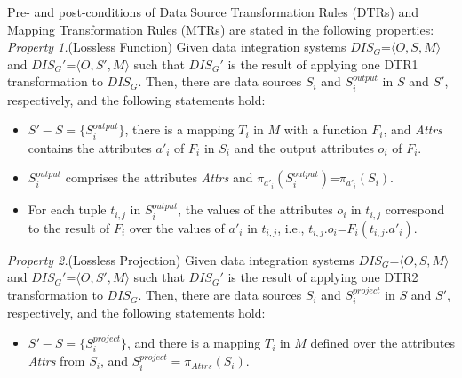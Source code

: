 Pre- and post-conditions of Data Source Transformation Rules (DTRs) and Mapping Transformation Rules (MTRs) are stated in the following properties:
\noindent\textit{Property 1.}(Lossless Function)
\label{property:p1}
Given data integration systems $DIS_G$=$\langle O,S,M \rangle$ and  $DIS_G'$=$\langle O,S',M \rangle$ such that $DIS_G'$ is the result of applying one DTR1 transformation to $DIS_G$. Then, there are data sources $S_i$ and 
$S_i^{output}$ in $S$ and $S'$, respectively, and the following statements hold:
\begin{itemize}
    \item $S'- S=\{S_i^{output}\}$, there is a mapping $T_i$ in $M$ with a function $F_i$, and \textit{Attrs} contains the attributes $a'_i$ of $F_i$ in $S_i$ and the output attributes $o_i$ of $F_i$. 
    \item  $S_i^{output}$ comprises the attributes \textit{Attrs} and $\pi_{a'_i}(S_i^{output})$=$\pi_{a'_i}(S_i)$.  
    \item For each tuple $t_{i,j}$ in $S_i^{output}$, the values of the attributes $o_i$ in $t_{i,j}$ correspond to the result of $F_i$ over the values of $a'_i$ in $t_{i,j}$, i.e., $t_{i,j}.o_i$=$F_i(t_{i,j}.a'_i)$. 
    
\end{itemize}


\noindent\textit{Property 2.}(Lossless Projection)
\label{property:p2}
Given data integration systems $DIS_G$=$\langle O,S,M \rangle$ and  $DIS_G'$=$\langle O,S',M \rangle$ such that $DIS_G'$ is the result of applying one DTR2 transformation to $DIS_G$. Then, there are data sources $S_i$ 
and $S_i^{project}$ in $S$ and $S'$, respectively, and the following statements hold:
\begin{itemize}
    \item $S'- S=\{S_i^{project}\}$, and there is a mapping $T_i$ in $M$ defined over the attributes \textit{Attrs} from $S_i$, and $S_i^{project}=\pi_{\textit{Attrs}}(S_i)$. 
\end{itemize}


